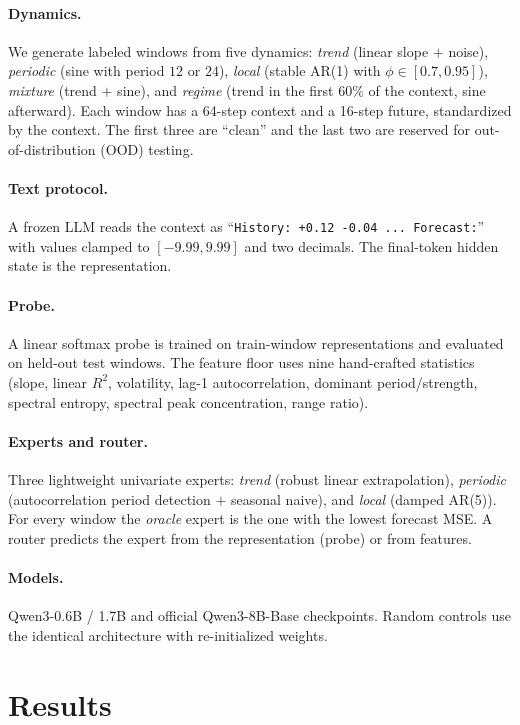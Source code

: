 \documentclass{article}
\begin{document}
\paragraph{Dynamics.}  We generate labeled windows from five dynamics:
\emph{trend} (linear slope $+$ noise), \emph{periodic} (sine with period
$12$ or $24$), \emph{local} (stable AR(1) with $\phi\in[0.7,0.95]$),
\emph{mixture} (trend $+$ sine), and \emph{regime} (trend in the first $60\%$
of the context, sine afterward).  Each window has a 64-step context and a
16-step future, standardized by the context.  The first three are ``clean''
and the last two are reserved for out-of-distribution (OOD) testing.

\paragraph{Text protocol.}  A frozen LLM reads the context as
``\texttt{History: +0.12 -0.04 ... Forecast:}'' with values clamped to
$[-9.99,9.99]$ and two decimals.  The final-token hidden state is the
representation.

\paragraph{Probe.}  A linear softmax probe is trained on train-window
representations and evaluated on held-out test windows.  The feature floor uses
nine hand-crafted statistics (slope, linear $R^2$, volatility, lag-1
autocorrelation, dominant period/strength, spectral entropy, spectral peak
concentration, range ratio).

\paragraph{Experts and router.}  Three lightweight univariate experts:
\emph{trend} (robust linear extrapolation), \emph{periodic} (autocorrelation
period detection $+$ seasonal naive), and \emph{local} (damped AR(5)).  For
every window the \emph{oracle} expert is the one with the lowest forecast MSE.
A router predicts the expert from the representation (probe) or from features.

\paragraph{Models.}  Qwen3-0.6B / 1.7B and official Qwen3-8B-Base checkpoints.
Random controls use the identical architecture with re-initialized weights.

\section{Results}\label{sec:results}
\end{document}
